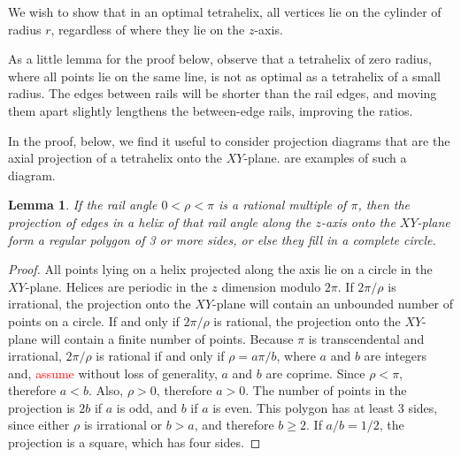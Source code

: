 \documentclass[twocolumn,10pt]{asme2ej}
\newtheorem{lemma}{Lemma}
\newcommand{\highlighttext}[1] {\textcolor{red}{#1}}
\begin{document}
We wish to show that in an optimal tetrahelix, all vertices lie on the cylinder
of radius $r$, regardless of where they lie on the $z$-axis.

As a little lemma for the proof below, observe that a tetrahelix of zero radius, where
all points lie on the same line,
is not as optimal as a tetrahelix of a small radius. The edges between rails will be
shorter than the rail edges, and moving them apart slightly lengthens the between-edge
rails, improving the ratios.

In the proof, below, we find it useful to consider projection diagrams that are the axial projection
of a tetrahelix onto the $XY$-plane.  are examples
of such a diagram.
\begin{lemma}
  If the rail angle $0 < \rho < \pi$ is a rational multiple of $\pi$, then the projection of
  edges in a helix of that rail angle  along the $z$-axis onto the $XY$-plane form a
  regular polygon of 3 or more sides, or else they fill in a complete circle.
  \label{lemma:ngon}
\end{lemma}
\begin{proof}
  All points lying on a helix projected along the axis lie on a circle in the $XY$-plane.
  Helices are periodic in the $z$ dimension modulo $2\pi$.
  If $2\pi/\rho$ is irrational, the projection onto the $XY$-plane will contain
  an unbounded number of points on a circle.
  If and only if $2\pi/\rho$ is rational, the projection onto
  the $XY$-plane will contain a finite number of points.
  Because $\pi$ is transcendental and irrational,
  $2\pi/\rho$ is rational if and only if $\rho = a\pi/b$, where $a$ and $b$ are integers
  and, \highlighttext{assume} without loss of generality, $a$ and $b$ are coprime.
  Since $\rho < \pi$, therefore $a < b$. Also, $\rho > 0$, therefore $a > 0$.
  The number of points in the projection is $2b$ if $a$ is odd, and $b$ if $a$ is even.
  This polygon has at least 3 sides, since either $\rho$ is irrational or $b > a$, and therefore
  $b \geq 2$. If $a/b = 1/2$, the projection is a square, which has four sides. 
\end{proof}
\end{document}
